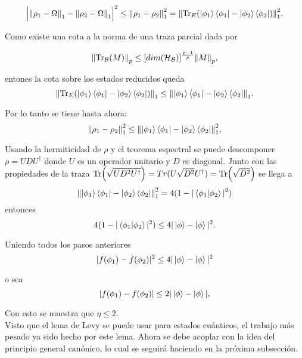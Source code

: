 \begin{equation}
\Big | \norm{\rho_{1}-\Omega}_{1} - \norm{\rho_{2}-\Omega}_{1} \Big |^2 \le \norm{\rho_{1}- \rho_{2} }_{1}^2= \norm{\Tr_{E}(\ket{\phi_{1}} \bra{\phi_{1}}-\ket{\phi_{2}} \bra{\phi_{2}})}_{1}^{2}.
\end{equation}

Como existe una cota a la norma de una traza parcial dada por

\begin{equation}
\norm{\Tr_{\mathcal{B}}(M)}_{p} \le [dim(\mathcal{H_{B}})]^{\frac{p-1}{p}} \norm{M}_{p},
\end{equation}

entones la cota sobre los estados reducidos queda 
\begin{equation}
\norm{\Tr_{E}(\ket{\phi_{1}} \bra{\phi_{1}}-\ket{\phi_{2}} \bra{\phi_{2}})}_{1} \le \norm{\ket{\phi_{1}} \bra{\phi_{1}}-\ket{\phi_{2}} \bra{\phi_{2}}}_{1}.
\end{equation}

Por lo tanto se tiene hasta ahora:
\begin{equation}
\norm{\rho_{1}- \rho_{2} }_{1}^2 \le \norm{\ket{\phi_{1}} \bra{\phi_{1}}-\ket{\phi_{2}} \bra{\phi_{2}}}_{1}^{2},
\end{equation}

Usando la hermiticidad de $\rho$ y el teorema espectral se puede descomponer $\rho= UDU^{\dag}$ donde $U$ es un operador unitario y $D$ es diagonal. Junto con las propiedades de la traza $\Tr(\sqrt{UD^2U^{\dag}})= Tr(U\sqrt{D^2}U^{\dag})= \Tr(\sqrt{D^{2}})$ se llega a
\begin{equation}
\norm{\ket{\phi_{1}} \bra{\phi_{1}}-\ket{\phi_{2}} \bra{\phi_{2}}}_{1}^{2} = 4(1-|\bra{\phi_{1}} \ket{\phi_{2}}|^{2})
\end{equation}
entonces
\begin{equation}
 4(1-|\bra{\phi_{1}} \ket{\phi_{2}}|^{2}) \le 4|\ket{\phi}-\ket{\phi}|^2.
\end{equation}

Uniendo todos los pasos anteriores
\begin{equation}
|f(\phi_{1})-f(\phi_{2})|^{2} \le  4|\ket{\phi}-\ket{\phi}|^2
\end{equation}

o sea 
\begin{equation}
|f(\phi_{1})-f(\phi_{2})| \le  2|\ket{\phi}-\ket{\phi}|,
\end{equation}

Con esto se muestra que $\eta \le 2$.
\\
Visto que el lema de Levy se puede usar para estados cuánticos, el trabajo más pesado ya sido hecho por este lema. Ahora se debe acoplar con la idea del principio general canónico, lo cual se seguirá haciendo en la próxima subsección.

